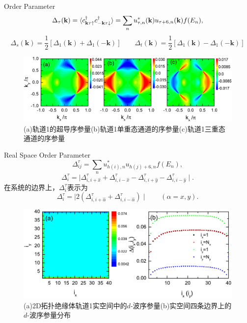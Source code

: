 \documentclass[10pt,aspectratio=169]{beamer} %
\begin{document}
\begin{frame}{Order Parameter}
	\begin{equation}
	\Delta_\tau({\bf k})=\langle c^\dagger_{{\bf k}\tau\uparrow}c^\dagger_{-{\bf k}\tau\downarrow}\rangle=\sum_n{u^{*}_{\tau,n}({\bf k})u_{\tau+6,n}({\bf k})}f(E_n),
	\end{equation}
\begin{equation}
\Delta_s(\mathbf{k})=\frac{1}{2}\left[\Delta_1(\mathbf{k})+\Delta_1(\mathbf{-k})\right]\qquad
\Delta_t(\mathbf{k})=\frac{1}{2}\left[\Delta_1(\mathbf{k})-\Delta_1(\mathbf{-k})\right]
\end{equation}
\begin{figure}[h]
\centering
\includegraphics[scale=0.7]{pic/fig20}
\caption{(a)轨道1的超导序参量(b)轨道1单重态通道的序参量(c)轨道1三重态通道的序参量}\label{fig19}
\end{figure}
\end{frame}
\begin{frame}{Real Space Order Parameter}
\begin{equation}
\Delta^\tau_{ij}=\sum_nu^{*}_{h(i),n}u_{h(j)+6,n}f(E_n),
\end{equation}
\begin{equation}
\Delta^\tau_i=\mid \Delta^\tau_{i,i+\hat{x}}+\Delta^\tau_{i,i-\hat{x}}
-\Delta^\tau_{i,i+\hat{y}}-\Delta^\tau_{i,i-\hat{y}}\mid.
\end{equation}
在系统的边界上，$\Delta_i^\tau$表示为
\begin{equation}
\Delta^\tau_i=\mid 2(\Delta^\tau_{i,i+\hat{\alpha}}+\Delta^\tau_{i,i-\hat{\alpha}}) \mid  \qquad (\alpha=x,y).
\end{equation}
\begin{figure}[h]
\centering
\includegraphics[scale=0.5]{pic/fig21}
\caption{(a)2D拓扑绝缘体轨道1实空间中的$d$-波序参量(b)实空间四条边界上的$d$-波序参量分布}\label{fig20}
\end{figure}
\end{frame}
\end{document}
